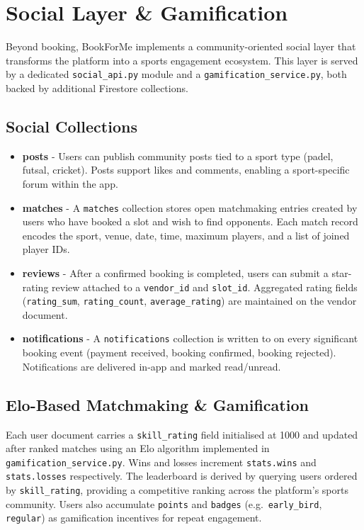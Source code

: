 \section{Social Layer \& Gamification}
\label{sec:sds-social}

Beyond booking, BookForMe implements a community-oriented social layer that transforms the platform into a sports engagement ecosystem. This layer is served by a dedicated \texttt{social\_api.py} module and a \texttt{gamification\_service.py}, both backed by additional Firestore collections.

\subsection{Social Collections}
\begin{itemize}
    \item \textbf{posts} - Users can publish community posts tied to a sport type (padel, futsal, cricket). Posts support likes and comments, enabling a sport-specific forum within the app.
    \item \textbf{matches} - A \texttt{matches} collection stores open matchmaking entries created by users who have booked a slot and wish to find opponents. Each match record encodes the sport, venue, date, time, maximum players, and a list of joined player IDs.
    \item \textbf{reviews} - After a confirmed booking is completed, users can submit a star-rating review attached to a \texttt{vendor\_id} and \texttt{slot\_id}. Aggregated rating fields (\texttt{rating\_sum}, \texttt{rating\_count}, \texttt{average\_rating}) are maintained on the vendor document.
    \item \textbf{notifications} - A \texttt{notifications} collection is written to on every significant booking event (payment received, booking confirmed, booking rejected). Notifications are delivered in-app and marked read/unread.
\end{itemize}

\subsection{Elo-Based Matchmaking \& Gamification}
Each user document carries a \texttt{skill\_rating} field initialised at 1000 and updated after ranked matches using an Elo algorithm implemented in \texttt{gamification\_service.py}. Wins and losses increment \texttt{stats.wins} and \texttt{stats.losses} respectively. The leaderboard is derived by querying users ordered by \texttt{skill\_rating}, providing a competitive ranking across the platform's sports community. Users also accumulate \texttt{points} and \texttt{badges} (e.g.\ \texttt{early\_bird}, \texttt{regular}) as gamification incentives for repeat engagement.

